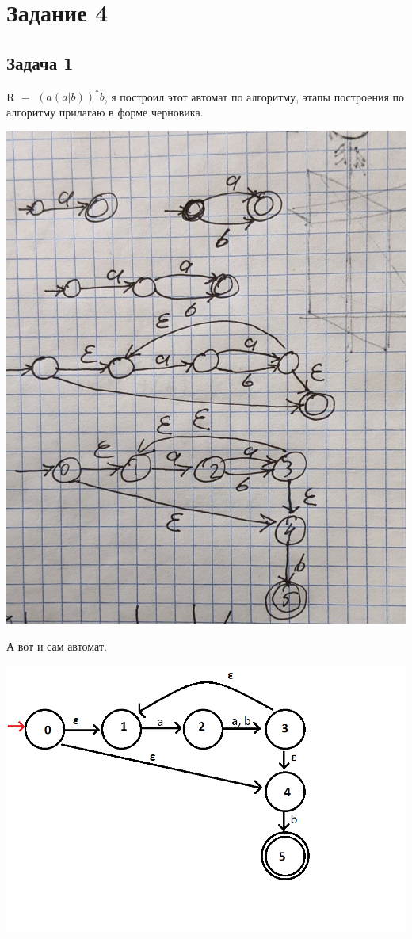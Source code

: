 \documentclass[a4paper,14pt]{article} %
\begin{document}

\section{Задание 4}
\subsection{Задача 1}
    R $=$ $(a(a|b))^{*}b$, я построил этот автомат по алгоритму, этапы построения по алгоритму прилагаю в форме черновика.
    
    \includegraphics[scale=0.23]{02.jpg}
    
    А вот и сам автомат.

    \includegraphics[scale=0.65]{01.png}
    
\end{document}

